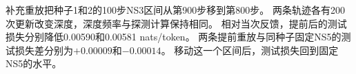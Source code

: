 补充重放把种子1和2的100步NS3区间从第900步移到第800步。
两条轨迹各有200次更新改变深度，深度频率与探测计算保持相同。
相对当次反馈，提前后的测试损失分别降低0.00590和0.00581 nats/token。
两条提前重放与同种子固定NS5的测试损失差分别为$+0.00009$和$-0.00014$。
移动这一个区间后，测试损失回到固定NS5的水平。
